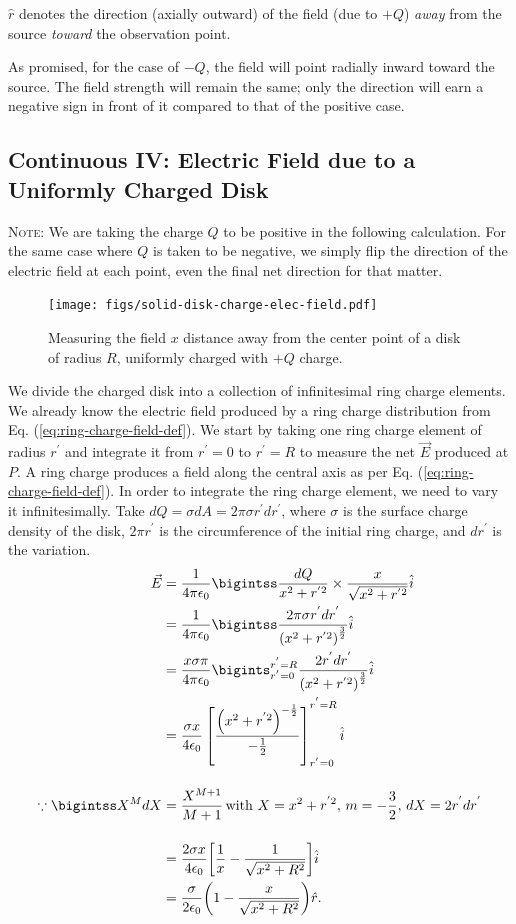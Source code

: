 \documentclass[12pt,b4paper]{article}
\begin{document}
$\hat{r}$ denotes the direction (axially outward) of the field (due to $+Q$) \textit{away} from the source \textit{toward} the observation point.

As promised, for the case of $-Q$, the field will point radially inward toward the source. The field strength will remain the same; only the direction will earn a negative sign in front of it compared to that of the positive case.
\subsection{Continuous IV: Electric Field due to a Uniformly Charged Disk}
\textsc{Note}: We are taking the charge $Q$ to be positive in the following calculation. For the same case where $Q$ is taken to be negative, we simply flip the direction of the electric field at each point, even the final net direction for that matter.
\begin{figure}[H]
    \centering
    \texttt{[image: figs/solid-disk-charge-elec-field.pdf]}
    \caption{Measuring the field $x$ distance away from the center point of a disk of radius $R$, uniformly charged with $+Q$ charge.}
    \label{fig:solid-disk-charge-elec-field}
\end{figure}
We divide the charged disk into a collection of infinitesimal ring charge elements. We already know the electric field produced by a ring charge distribution from Eq. (\ref{eq:ring-charge-field-def}). We start by taking one ring charge element of radius $r^{'}$ and integrate it from $r^{'}=0$ to $r^{'}=R$ to measure the net $\vec{E}$ produced at $P$. A ring charge produces a field along the central axis as per Eq. (\ref{eq:ring-charge-field-def}). In order to integrate the ring charge element, we need to vary it infinitesimally. Take $dQ=\sigma dA=2\pi\sigma r^{'}dr^{'}$, where $\sigma$ is the surface charge density of the disk, $2\pi r^{'}$ is the circumference of the initial ring charge, and $dr^{'}$ is the variation.
\begin{align}
    \vec{E} &= \frac{1}{4\pi\epsilon_0}\bigintss \frac{dQ}{x^2+r^{'2}}\times\frac{x}{\sqrt{x^2+r^{'2}}}\hat{i}\notag\\
    &= \frac{1}{4\pi\epsilon_0}\bigintss \frac{2\pi\sigma r^{'}dr^{'}}{\left(x^2+r^{'2}\right)^{\frac{3}{2}}}\hat{i}\notag\\
    &=\frac{x\sigma\pi}{4\pi\epsilon_0}\bigints_{r^{'}=0}^{r^{'}=R}\frac{2r^{'}dr^{'}}{\left(x^2+r^{'2}\right)^{\frac{3}{2}}}\hat{i}\notag\\
    &=\frac{\sigma x}{4\epsilon_0}\left[\frac{\left(x^2+r^{'2}\right)^{-\frac{1}{2}}}{-\frac{1}{2}}\right]_{r^{'}=0}^{r^{'}=R}\hat{i}\notag\\[12pt]
    \because\bigintss X^MdX&=\frac{X^{M+1}}{M+1}\,\text{with }X=x^2+r^{'2},\,m=-\frac{3}{2},\,dX=2r^{'}dr^{'}\notag\\[12pt]
    &=\frac{2\sigma x}{4\epsilon_0}\bigg[\frac{1}{x}-\frac{1}{\sqrt{x^2+R^2}}\bigg]\hat{i}\notag\\
    &=\frac{\sigma}{2\epsilon_0}\bigg(1-\frac{x}{\sqrt{x^2+R^2}}\bigg)\hat{r}.
\end{align}
\end{document}
